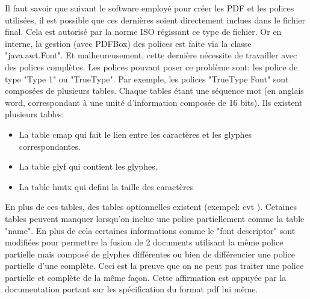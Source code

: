 Il faut savoir que suivant le software employé pour créer les PDF et
les polices utilisées, il est possible que ces dernières soient directement
inclues dans le fichier final. Cela est autorisé par la norme ISO régissant 
ce type de fichier. Or en interne, la gestion (avec PDFBox) des polices est faite via la 
classe "java.awt.Font". Et malheureusement, cette dernière nécessite de travailler
avec des polices complètes.  Les polices pouvant poser ce problème sont: les police de type "Type 1" ou
"TrueType".
Par exemple, les polices "TrueType Font" sont composées de plusieurs tables. Chaque 
tables étant une séquence mot (en anglais word, correspondant à une unité d'information composée de 
16 bits). Ils existent plusieurs tables:
\begin{itemize}
\item La table cmap qui fait le lien entre les caractères et les glyphes correspondantes.
\item La table glyf qui contient les glyphes.
\item La table hmtx qui defini la taille des caractères
\end{itemize}
En plus de ces tables, des tables optionnelles existent (exempel: cvt ).
Cetaines tables peuvent manquer lorsqu'on inclue une police partiellement comme la table "name".
En plus de cela certaines informations comme le "font descriptor" sont modifiées pour permettre la fusion de 2 documents
utilisant la même police partielle mais composé de glyphes différentes ou bien de différencier une police partielle d'une complète.
Ceci est la preuve que on ne peut pas traiter une police partielle et complète de la même façon. Cette affirmation est appuyée par
la documentation portant sur les spécification du format pdf lui même.


